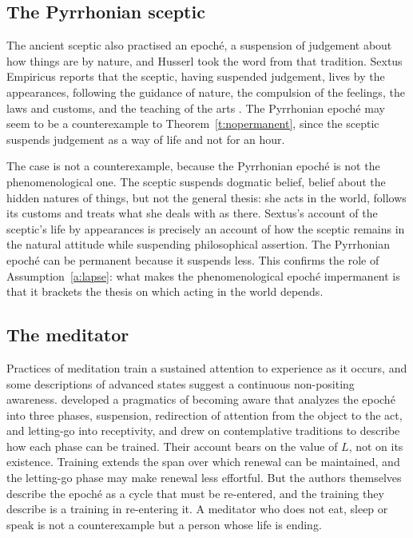 \documentclass{situationist-preprint}
\begin{document}
\subsection{The Pyrrhonian sceptic}

The ancient sceptic also practised an epoché, a suspension of judgement about how things are by nature, and Husserl took the word from that tradition. Sextus Empiricus reports that the sceptic, having suspended judgement, lives by the appearances, following the guidance of nature, the compulsion of the feelings, the laws and customs, and the teaching of the arts \citep[I.23--24]{Sextus}. The Pyrrhonian epoché may seem to be a counterexample to Theorem~\ref{t:nopermanent}, since the sceptic suspends judgement as a way of life and not for an hour.

The case is not a counterexample, because the Pyrrhonian epoché is not the phenomenological one. The sceptic suspends dogmatic belief, belief about the hidden natures of things, but not the general thesis: she acts in the world, follows its customs and treats what she deals with as there. Sextus's account of the sceptic's life by appearances is precisely an account of how the sceptic remains in the natural attitude while suspending philosophical assertion. The Pyrrhonian epoché can be permanent because it suspends less. This confirms the role of Assumption~\ref{a:lapse}: what makes the phenomenological epoché impermanent is that it brackets the thesis on which acting in the world depends.

\subsection{The meditator}

Practices of meditation train a sustained attention to experience as it occurs, and some descriptions of advanced states suggest a continuous non-positing awareness. \citet{Depraz2003} developed a pragmatics of becoming aware that analyzes the epoché into three phases, suspension, redirection of attention from the object to the act, and letting-go into receptivity, and drew on contemplative traditions to describe how each phase can be trained. Their account bears on the value of $L$, not on its existence. Training extends the span over which renewal can be maintained, and the letting-go phase may make renewal less effortful. But the authors themselves describe the epoché as a cycle that must be re-entered, and the training they describe is a training in re-entering it. A meditator who does not eat, sleep or speak is not a counterexample but a person whose life is ending.
\end{document}
